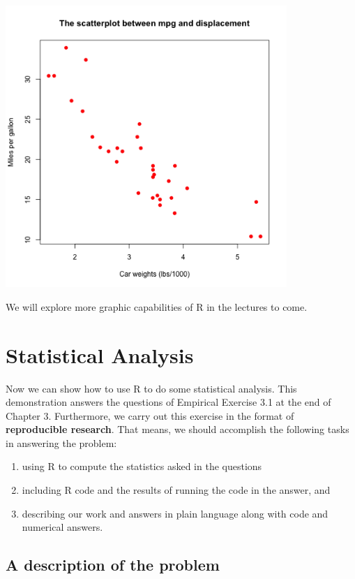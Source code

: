 \documentclass[a4paper,11pt]{article}
\begin{document}
\begin{center}
\includegraphics[width=0.8\textwidth]{figure/scatterplot.png}
\end{center}

We will explore more graphic capabilities of R in the lectures to
come.


\section{Statistical Analysis}
\label{sec:orgb6d8b2c}

Now we can show how to use R to do some statistical
analysis. This demonstration answers the questions of Empirical
Exercise 3.1 at the end
of Chapter 3. Furthermore, we carry out this exercise in the format of
\textbf{reproducible research}. That means, we should accomplish the
following tasks in answering the problem:
\begin{enumerate}
\item using R to compute the statistics
asked in the questions
\item including R code and the results of running the code in the answer, and
\item describing our work and answers in plain language along with code
and numerical answers.
\end{enumerate}


\subsection{A description of the problem}
\label{sec:orga83388f}
\end{document}
